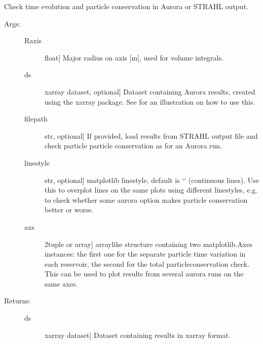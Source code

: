 \documentclass[letterpaper,10pt,english]{sphinxmanual}
\begin{document}
\begin{fulllineitems}
\label{\detokenize{aurora:aurora.particle_conserv.check_1d_conserv}}
Check time evolution and particle conservation in Aurora or STRAHL output.
\begin{description}
\item[{Args:}] \leavevmode\begin{description}
\item[{Raxis}] \leavevmode{[}float{]}
Major radius on axis {[}m{]}, used for volume integrals.

\item[{ds}] \leavevmode{[}xarray dataset, optional{]}
Dataset containing Aurora results, created using the xarray package. 
See  for an illustration on how
to use this.

\item[{filepath}] \leavevmode{[}str, optional{]}
If provided, load results from STRAHL output file and check particle
particle conservation as for an Aurora run.

\item[{linestyle}] \leavevmode{[}str, optional{]}
matplotlib linestyle, default is ‘\sphinxhyphen{}‘ (continuous lines). Use this to 
overplot lines on the same plots using different linestyles, e.g. to check
whether some aurora option makes particle conservation better or worse.

\item[{axs}] \leavevmode{[}2\sphinxhyphen{}tuple or array{]}
array\sphinxhyphen{}like structure containing two matplotlib.Axes instances: the first one 
for the separate particle time variation in each reservoir, the second for 
the total particle\sphinxhyphen{}conservation check. This can be used to plot results 
from several aurora runs on the same axes.

\end{description}

\item[{Returns:}] \leavevmode\begin{description}
\item[{ds}] \leavevmode{[}xarray dataset{]}
Dataset containing results in xarray format.


\end{description}
\end{description}
\end{fulllineitems}
\end{document}
